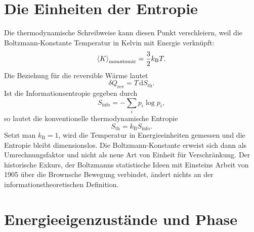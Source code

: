 \section{Die Einheiten der Entropie}

\begin{classroomqa}
\end{classroomqa}

Die thermodynamische Schreibweise kann diesen Punkt verschleiern, weil die Boltzmann-Konstante Temperatur in Kelvin mit Energie verknüpft:
\begin{equation}
\left\langle K\right\rangle_{\mathrm{monatomic}}
=\frac32 k_{\mathrm B}T.
\end{equation}
Die Beziehung für die reversible Wärme lautet
\begin{equation}
\delta Q_{\mathrm{rev}}=T\,\mathrm dS_{\mathrm{th}}.
\end{equation}
Ist die Informationsentropie gegeben durch
\begin{equation}
S_{\mathrm{info}}=-\sum_i p_i\log p_i,
\end{equation}
so lautet die konventionelle thermodynamische Entropie
\begin{equation}
S_{\mathrm{th}}=k_{\mathrm B}S_{\mathrm{info}}.
\end{equation}
Setzt man \(k_{\mathrm B}=1\), wird die Temperatur in Energieeinheiten gemessen und die Entropie bleibt dimensionslos. Die Boltzmann-Konstante erweist sich dann als Umrechnungsfaktor und nicht als neue Art von Einheit für Verschränkung. Der historische Exkurs, der Boltzmanns statistische Ideen mit Einsteins Arbeit von 1905 über die Brownsche Bewegung verbindet, ändert nichts an der informationstheoretischen Definition.

\section{Energieeigenzustände und Phase}

\begin{classroomqa}
\end{classroomqa}

